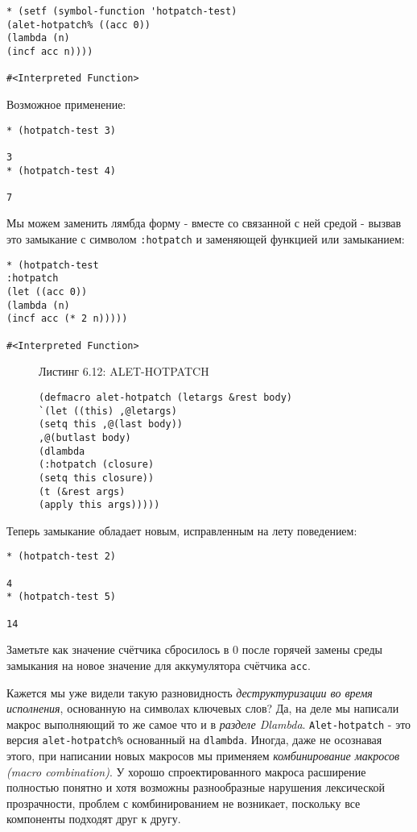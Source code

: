 \begin{verbatim}
* (setf (symbol-function 'hotpatch-test)
(alet-hotpatch% ((acc 0))
(lambda (n)
(incf acc n))))

#<Interpreted Function>
\end{verbatim}

Возможное применение:

\begin{verbatim}
* (hotpatch-test 3)

3
* (hotpatch-test 4)

7
\end{verbatim}

Мы можем заменить лямбда форму - вместе со связанной с ней средой - вызвав это замыкание с символом \verb":hotpatch" и заменяющей функцией или замыканием:

\begin{verbatim}
* (hotpatch-test
:hotpatch
(let ((acc 0))
(lambda (n)
(incf acc (* 2 n)))))

#<Interpreted Function>
\end{verbatim}

\begin{figure}Листинг 6.12: ALET-HOTPATCH\label{listing_6.12}
\listbegin
\begin{verbatim}
(defmacro alet-hotpatch (letargs &rest body)
`(let ((this) ,@letargs)
(setq this ,@(last body))
,@(butlast body)
(dlambda
(:hotpatch (closure)
(setq this closure))
(t (&rest args)
(apply this args)))))
\end{verbatim}
\listend
\end{figure}

Теперь замыкание обладает новым, исправленным на лету поведением:

\begin{verbatim}
* (hotpatch-test 2)

4
* (hotpatch-test 5)

14
\end{verbatim}

Заметьте как значение счётчика сбросилось в 0 после горячей замены среды замыкания на новое значение для аккумулятора счётчика \verb"acc".

Кажется мы уже видели такую разновидность \emph{деструктуризации во время исполнения}, основанную на символах ключевых слов? Да, на деле мы написали макрос выполняющий то же самое что и в \emph{разделе Dlambda}. \verb"Alet-hotpatch" - это версия \verb"alet-hotpatch%" основанный на \verb"dlambda". Иногда, даже не осознавая этого, при написании новых макросов мы применяем \emph{комбинирование макросов (macro combination)}. У хорошо спроектированного макроса расширение полностью понятно и хотя возможны разнообразные нарушения лексической прозрачности, проблем с комбинированием не возникает, поскольку все компоненты подходят друг к другу.

